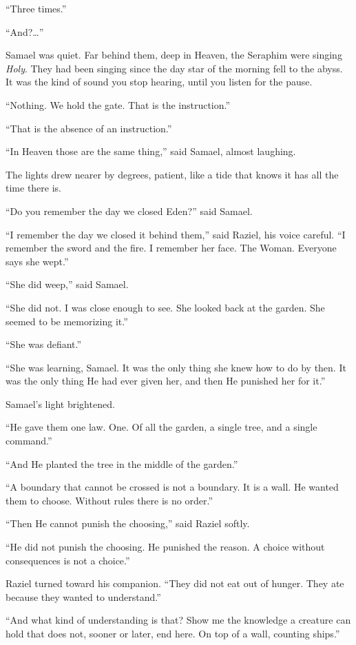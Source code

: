 \documentclass[11pt]{article}
\begin{document}
``Three times.''

``And?\ldots{}''

Samael was quiet. Far behind them, deep in Heaven, the Seraphim were singing \emph{Holy}. They had been singing since the day star of the morning fell to the abyss. It was the kind of sound you stop hearing, until you listen for the pause.

``Nothing. We hold the gate. That is the instruction.''

``That is the absence of an instruction.''

``In Heaven those are the same thing,'' said Samael, almost laughing.

The lights drew nearer by degrees, patient, like a tide that knows it has all the time there is.

``Do you remember the day we closed Eden?'' said Samael.

``I remember the day we closed it behind them,'' said Raziel, his voice careful. ``I remember the sword and the fire. I remember her face. The Woman. Everyone says she wept.''

``She did weep,'' said Samael.

``She did not. I was close enough to see. She looked back at the garden. She seemed to be memorizing it.''

``She was defiant.''

``She was learning, Samael. It was the only thing she knew how to do by then. It was the only thing He had ever given her, and then He punished her for it.''

Samael's light brightened.

``He gave them one law. One. Of all the garden, a single tree, and a single command.''

``And He planted the tree in the middle of the garden.''

``A boundary that cannot be crossed is not a boundary. It is a wall. He wanted them to choose. Without rules there is no order.''

``Then He cannot punish the choosing,'' said Raziel softly.

``He did not punish the choosing. He punished the reason. A choice without consequences is not a choice.''

Raziel turned toward his companion. ``They did not eat out of hunger. They ate because they wanted to understand.''

``And what kind of understanding is that? Show me the knowledge a creature can hold that does not, sooner or later, end here. On top of a wall, counting ships.''
\end{document}
